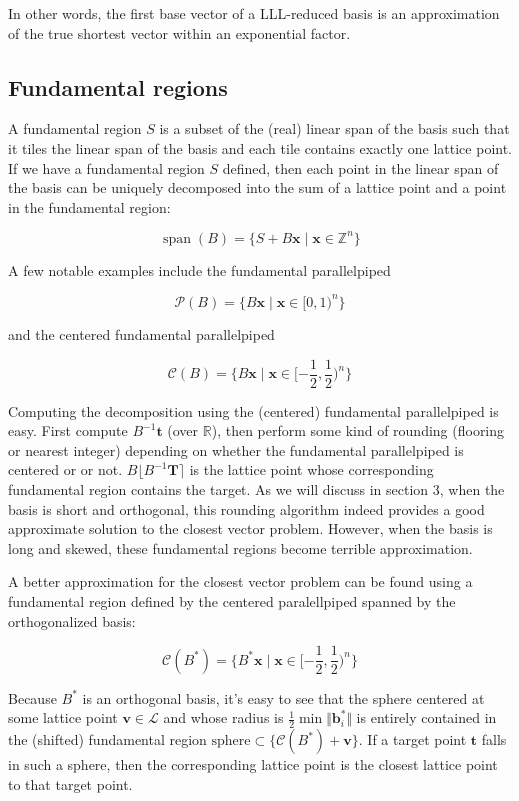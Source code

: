 In other words, the first base vector of a LLL-reduced basis is an approximation of the true shortest vector within an exponential factor.


\subsection{Fundamental regions}
A fundamental region $S$ is a subset of the (real) linear span of the basis such that it tiles the linear span of the basis and each tile contains exactly one lattice point. If we have a fundamental region $S$ defined, then each point in the linear span of the basis can be uniquely decomposed into the sum of a lattice point and a point in the fundamental region:

$$
\operatorname{span}(B) = \{S + B\mathbf{x} \mid \mathbf{x} \in \mathbb{Z}^n\}
$$

A few notable examples include the fundamental parallelpiped 

$$
\mathcal{P}(B) = \{B\mathbf{x} \mid \mathbf{x} \in [0, 1)^n\}
$$

and the centered fundamental parallelpiped

$$
\mathcal{C}(B) = \{B\mathbf{x} \mid \mathbf{x} \in [-\frac{1}{2}, \frac{1}{2})^n\}
$$

Computing the decomposition using the (centered) fundamental parallelpiped is easy. First compute $B^{-1}\mathbf{t}$ (over $\mathbb{R}$), then perform some kind of rounding (flooring or nearest integer) depending on whether the fundamental parallelpiped is centered or or not. $B\lfloor B^{-1}\mathbf{T} \rceil$ is the lattice point whose corresponding fundamental region contains the target. As we will discuss in section 3, when the basis is short and orthogonal, this rounding algorithm indeed provides a good approximate solution to the closest vector problem. However, when the basis is long and skewed, these fundamental regions become terrible approximation.

A better approximation for the closest vector problem can be found using a fundamental region defined by the centered paralellpiped spanned by the orthogonalized basis:

$$
\mathcal{C}(B^\ast) = \{B^\ast\mathbf{x} \mid \mathbf{x} \in [-\frac{1}{2}, \frac{1}{2})^n\}
$$

Because $B^\ast$ is an orthogonal basis, it's easy to see that the sphere centered at some lattice point $\mathbf{v} \in \mathcal{L}$ and whose radius is $\frac{1}{2}\min \Vert \mathbf{b}_i^\ast\Vert$ is entirely contained in the (shifted) fundamental region $\text{sphere} \subset \{\mathcal{C}(B^\ast) + \mathbf{v}\}$. If a target point $\mathbf{t}$ falls in such a sphere, then the corresponding lattice point is the closest lattice point to that target point.

